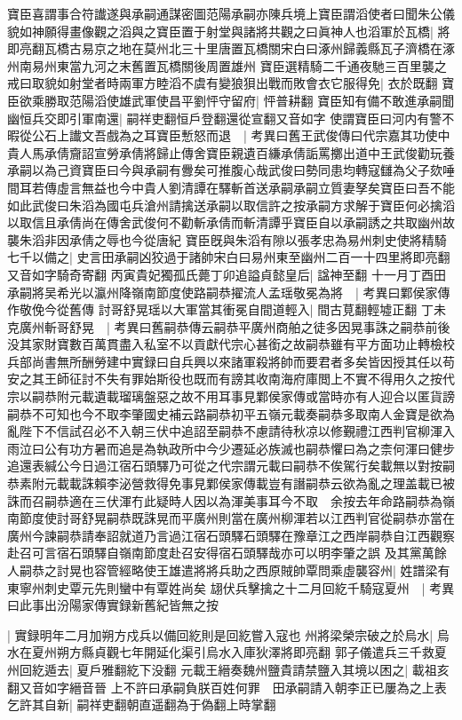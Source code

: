 寶臣喜謂事合符䜟遂與承嗣通謀密圖范陽承嗣亦陳兵境上寶臣謂滔使者曰聞朱公儀貌如神願得畫像觀之滔與之寶臣置于射堂與諸將共觀之曰眞神人也滔軍於瓦橋|{
	將即亮翻瓦橋古易京之地在莫州北三十里唐置瓦橋關宋白曰涿州歸義縣瓦子濟橋在涿州南易州東當九河之末舊置瓦橋關後周置雄州}
寶臣選精騎二千通夜馳三百里襲之戒曰取貌如射堂者時兩軍方睦滔不虞有變狼狽出戰而敗會衣它服得免|{
	衣於既翻}
寶臣欲乘勝取范陽滔使雄武軍使昌平劉怦守留府|{
	怦普耕翻}
寶臣知有備不敢進承嗣聞幽恒兵交即引軍南還|{
	嗣祥吏翻恒戶登翻還從宣翻又音如字}
使謂寶臣曰河内有警不暇從公石上䜟文吾戲為之耳寶臣慙怒而退　|{
	考異曰舊王武俊傳曰代宗嘉其功使中貴人馬承倩齎詔宣勞承倩將歸止傳舍寶臣親遺百縑承倩詬罵擲出道中王武俊勸玩養承嗣以為己資寶臣曰今與承嗣有釁矣可推腹心哉武俊曰勢同患均轉寇讎為父子欬唾間耳若傳虛言無益也今中貴人劉清譚在驛斬首送承嗣承嗣立質妻孥矣寶臣曰吾不能如此武俊曰朱滔為國屯兵滄州請擒送承嗣以取信許之按承嗣方求解于寶臣何必擒滔以取信且承倩尚在傳舍武俊何不勸斬承倩而斬清譚乎寶臣自以承嗣誘之共取幽州故襲朱滔非因承倩之辱也今從唐紀}
寶臣旣與朱滔有隙以張孝忠為易州刺史使將精騎七千以備之|{
	史言田承嗣凶狡過于諸帥宋白曰易州東至幽州二百一十四里將即亮翻又音如字騎奇寄翻}
丙寅貴妃獨孤氏薨丁卯追謚貞懿皇后|{
	諡神至翻}
十一月丁酉田承嗣將吴希光以瀛州降嶺南節度使路嗣恭擢流人孟瑶敬冕為將　|{
	考異曰鄴侯家傳作敬俛今從舊傳}
討哥舒晃瑶以大軍當其衝冕自間道輕入|{
	間古莧翻輕墟正翻}
丁未克廣州斬哥舒晃　|{
	考異曰舊嗣恭傳云嗣恭平廣州商舶之徒多因晃事誅之嗣恭前後没其家財寶數百萬貫盡入私室不以貢獻代宗心甚銜之故嗣恭雖有平方面功止轉檢校兵部尚書無所酬勞建中實録曰自兵興以來諸軍殺將帥而要君者多矣皆因授其任以苟安之其王師征討不失有罪始斯役也既而有謗其收南海府庫閲上不實不得用久之按代宗以嗣恭附元載遺載瑠璃盤惡之故不用耳事見鄴侯家傳或當時亦有人迎合以匿貨謗嗣恭不可知也今不取李肇國史補云路嗣恭初平五嶺元載奏嗣恭多取南人金寶是欲為亂陛下不信試召必不入朝三伏中追詔至嗣恭不慮請待秋凉以修覲禮江西判官柳渾入雨泣曰公有功方暑而追是為執政所中今少遷延必族滅也嗣恭懼曰為之柰何渾曰健步追還表緘公今日過江宿石頭驛乃可從之代宗謂元載曰嗣恭不俟駕行矣載無以對按嗣恭素附元載載誅賴李泌營救得免事見鄴侯家傳載豈有譖嗣恭云欲為亂之理盖載已被誅而召嗣恭適在三伏渾冇此疑時人因以為渾美事耳今不取　余按去年命路嗣恭為嶺南節度使討哥舒晃嗣恭既誅晃而平廣州則當在廣州柳渾若以江西判官從嗣恭亦當在廣州今諫嗣恭請奉詔就道乃言過江宿石頭驛石頭驛在豫章江之西岸嗣恭自江西觀察赴召可言宿石頭驛自嶺南節度赴召安得宿石頭驛哉亦可以明李肇之誤}
及其黨萬餘人嗣恭之討晃也容管經略使王雄遣將將兵助之西原賊帥覃問乘虛襲容州|{
	姓譜梁有東寧州刺史覃元先則蠻中有覃姓尚矣}
翃伏兵擊擒之十二月回紇千騎寇夏州　|{
	考異曰此事出汾陽家傳實録新舊紀皆無之按}


|{
	實録明年二月加朔方戍兵以備回紇則是回紇嘗入寇也}
州將梁榮宗破之於烏水|{
	烏水在夏州朔方縣貞觀七年開延化渠引烏水入庫狄澤將即亮翻}
郭子儀遣兵三千救夏州回紇遁去|{
	夏戶雅翻紇下没翻}
元載王縉奏魏州鹽貴請禁鹽入其境以困之|{
	載祖亥翻又音如字縉音晉}
上不許曰承嗣負朕百姓何罪　田承嗣請入朝李正已屢為之上表乞許其自新|{
	嗣祥吏翻朝直遥翻為于偽翻上時掌翻}


